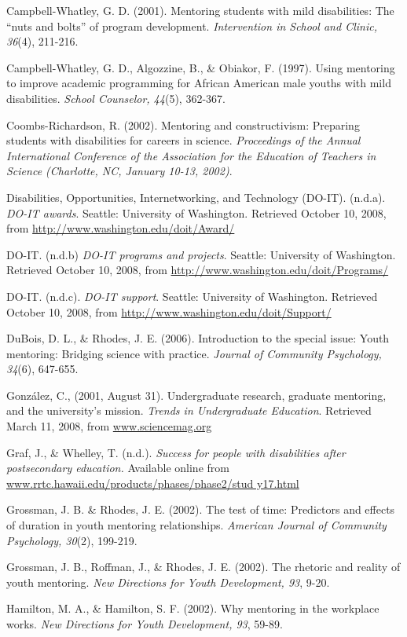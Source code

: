 \documentclass[11.5pt]{sig-alternate} %
\begin{document}
Campbell-Whatley, G. D. (2001). Mentoring students with mild disabilities: The “nuts and bolts” of program development. \textit{Intervention in School and Clinic, 36}(4), 211-216.

Campbell-Whatley, G. D., Algozzine, B., \& Obiakor, F. (1997). Using mentoring to improve academic programming for African American male youths with mild disabilities. \textit{School Counselor, 44}(5), 362-367.

Coombs-Richardson, R. (2002). Mentoring and constructivism: Preparing students with disabilities for careers in science.\textit{ Proceedings of the Annual International Conference of the Association for the Education of Teachers in Science (Charlotte, NC, January 10-13, 2002)}.

Disabilities, Opportunities, Internetworking, and Technology (DO-IT). (n.d.a).\textit{ DO-IT awards}. Seattle: University of Washington. Retrieved October 10, 2008, from \url{http://www.washington.edu/doit/Award/}

DO-IT. (n.d.b) \textit{DO-IT programs and projects}. Seattle: University of Washington. Retrieved October 10, 2008, from \url{http://www.washington.edu/doit/Programs/}

DO-IT. (n.d.c).\textit{ DO-IT support}. Seattle: University of Washington. Retrieved October 10, 2008, from \url{http://www.washington.edu/doit/Support/}

DuBois, D. L., \& Rhodes, J. E. (2006). Introduction to the special issue: Youth mentoring: Bridging science with practice. \textit{Journal of Community Psychology, 34}(6), 647-655.

González, C., (2001, August 31). Undergraduate research, graduate mentoring, and the university's mission. \textit{Trends in Undergraduate Education}. Retrieved March 11, 2008, from \url{www.sciencemag.org}

Graf, J., \& Whelley, T. (n.d.). \textit{Success for people with disabilities after postsecondary education.} Available online from \url{www.rrtc.hawaii.edu/products/phases/phase2/stud y17.html}

Grossman, J. B. \& Rhodes, J. E. (2002). The test of time: Predictors and effects of duration in youth mentoring relationships.\textit{ American Journal of Community Psychology, 30}(2), 199-219.

Grossman, J. B., Roffman, J., \& Rhodes, J. E. (2002). The rhetoric and reality of youth mentoring. \textit{New Directions for Youth Development, 93}, 9-20.

Hamilton, M. A., \& Hamilton, S. F. (2002). Why mentoring in the workplace works. \textit{New Directions for Youth Development, 93}, 59-89.
\end{document}

